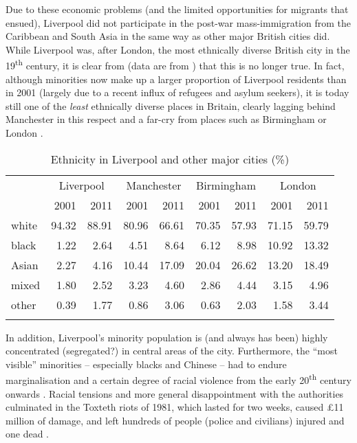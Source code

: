 Due to these economic problems (and the limited opportunities for migrants that ensued), Liverpool did not participate in the post-war mass-immigration from the Caribbean and South Asia in the same way as other major British cities did.
While Liverpool was, after London, the most ethnically diverse British city in the 19\textsuperscript{th} century, it is clear from  (data are from \citealt{nomis}) that this is no longer true.
In fact, although minorities now make up a larger proportion of Liverpool residents than in 2001 (largely due to a recent influx of refugees and asylum seekers), it is today still one of the \emph{least} ethnically diverse places in Britain, clearly lagging behind Manchester in this respect and a far-cry from places such as Birmingham or London \citep[cf.][187]{pooley2006}.

	\begin{table}[h]
		
		\caption{Ethnicity in Liverpool and other major cities (\%)}
		\begin{tabular}{lrrrrrrrr}
			\lsptoprule
	 		& \multicolumn{2}{c}{Liverpool} & \multicolumn{2}{c}{Manchester} & \multicolumn{2}{c}{Birmingham} & \multicolumn{2}{c}{London} \\
			 & 2001 & 2011 & 2001 & 2011 & 2001 & 2011 & 2001 & 2011 \\
			 \midrule
			 white & 94.32 & 88.91 & 80.96 & 66.61 & 70.35 & 57.93 & 71.15 & 59.79 \\
			 black & 1.22 & 2.64 & 4.51 & 8.64 & 6.12 & 8.98 & 10.92 & 13.32 \\
	 		 Asian & 2.27 & 4.16 & 10.44 & 17.09 & 20.04 & 26.62 & 13.20 & 18.49 \\
	 		 mixed & 1.80 & 2.52 & 3.23 & 4.60 & 2.86 & 4.44 & 3.15 & 4.96 \\
	 		 other & 0.39 & 1.77 & 0.86 & 3.06 & 0.63 & 2.03 & 1.58 & 3.44 \\
	 		 \lspbottomrule
		\end{tabular}
		\label{tab.ethnicity}
	\end{table}

In addition, Liverpool's minority population is (and always has been) highly concentrated (segregated?) in central areas of the city.
Furthermore, the ``most visible'' minorities -- especially blacks and Chinese -- had to endure marginalisation and a certain degree of racial violence from the early 20\textsuperscript{th} century onwards \citep[cf.][189--191]{pooley2006}.
Racial tensions and more general disappointment with the authorities culminated in the Toxteth riots of 1981, which lasted for two weeks, caused \pounds11 million of damage, and left hundreds of people (police and civilians) injured and one dead \citep[cf][440--444]{murden2006}.

